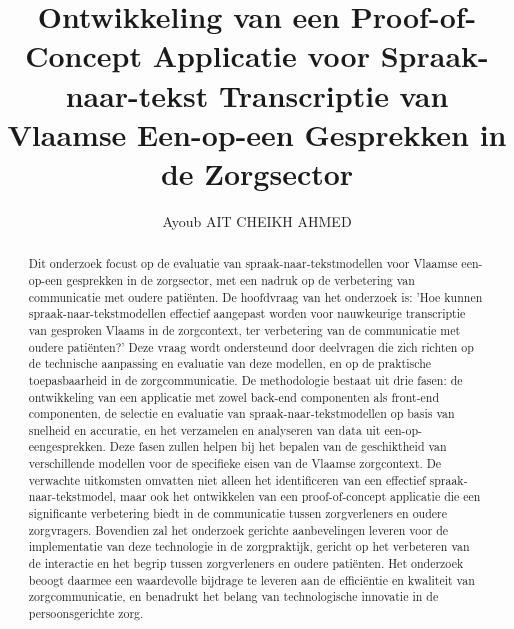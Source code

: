 \documentclass{hogent-article}
\title{Ontwikkeling van een Proof-of-Concept Applicatie voor Spraak-naar-tekst Transcriptie van Vlaamse Een-op-een Gesprekken in de Zorgsector}
\author{Ayoub AIT CHEIKH AHMED}
\begin{document}
\begin{abstract}
Dit onderzoek focust op de evaluatie van spraak-naar-tekstmodellen voor Vlaamse een-op-een gesprekken in de zorgsector, met een nadruk op de verbetering van communicatie met oudere patiënten. De hoofdvraag van het onderzoek is: 'Hoe kunnen spraak-naar-tekstmodellen effectief aangepast worden voor nauwkeurige transcriptie van gesproken Vlaams in de zorgcontext, ter verbetering van de communicatie met oudere patiënten?' Deze vraag wordt ondersteund door deelvragen die zich richten op de technische aanpassing en evaluatie van deze modellen, en op de praktische toepasbaarheid in de zorgcommunicatie.
De methodologie bestaat uit drie fasen: de ontwikkeling van een applicatie met zowel back-end componenten als front-end componenten, de selectie en evaluatie van spraak-naar-tekstmodellen op basis van snelheid en accuratie, en het verzamelen en analyseren van data uit een-op-eengesprekken. Deze fasen zullen helpen bij het bepalen van de geschiktheid van verschillende modellen voor de specifieke eisen van de Vlaamse zorgcontext.
De verwachte uitkomsten omvatten niet alleen het identificeren van een effectief spraak-naar-tekstmodel, maar ook het ontwikkelen van een proof-of-concept applicatie die een significante verbetering biedt in de communicatie tussen zorgverleners en oudere zorgvragers. Bovendien zal het onderzoek gerichte aanbevelingen leveren voor de implementatie van deze technologie in de zorgpraktijk, gericht op het verbeteren van de interactie en het begrip tussen zorgverleners en oudere patiënten. Het onderzoek beoogt daarmee een waardevolle bijdrage te leveren aan de efficiëntie en kwaliteit van zorgcommunicatie, en benadrukt het belang van technologische innovatie in de persoonsgerichte zorg.
\end{abstract}

\tableofcontents



\printbibliography[heading=bibintoc]
\end{document}
